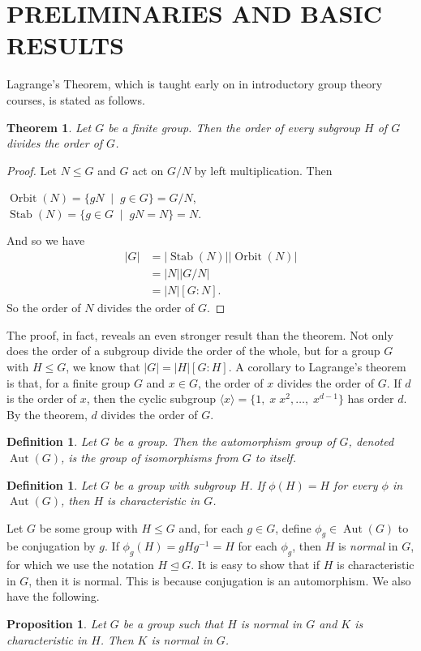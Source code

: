 \documentclass[12pt]{report}
\theoremstyle{newthm}
\newtheorem{Proposition}[lem]{Proposition}
\newtheorem{Theorem}[lem]{Theorem}
\newtheorem{Definition}[lem]{Definition}
\DeclareMathOperator{\Aut}{Aut}
\DeclareMathOperator{\Orbit}{Orbit}
\DeclareMathOperator{\Stab}{Stab}
\begin{document}
\section{PRELIMINARIES AND BASIC RESULTS}



Lagrange's Theorem, which is taught early on in introductory group theory courses, is stated as follows.

\begin{Theorem} Let $G$ be a finite group. Then the order of every subgroup $H$ of $G$ divides the order of $G$.
\end{Theorem}
\begin{proof}
Let $N\leq G$ and $G$ act on $G/N$ by left multiplication. Then \begin{center}$\Orbit(N)=\{gN\;\mid\;g\in G\} = G/N$, \\ $\Stab(N)=\{g\in G\;\mid\; gN=N\}=N$.\end{center} And so we have \begin{align*}
    |G| &= |\Stab(N)||\Orbit(N)|\\
    &= |N||G/N| \\
    &= |N|[G:N].
\end{align*}
So the order of $N$ divides the order of $G$.
\end{proof}


The proof, in fact, reveals an even stronger result than the theorem. Not only does the order of a subgroup divide the order of the whole, but for a group $G$ with $H\leq G$, we know that $|G|=|H|[G:H]$. 
A corollary to  Lagrange's theorem is that, for a finite group $G$ and $x\in G$, the order of $x$ divides the order of $G$. If $d$ is the order of $x$, then the cyclic subgroup $\langle x \rangle = \{1,\;x\;x^2,\dotsc ,\; x^{d-1}\}$ has order $d$. By the theorem, $d$ divides the order of $G$.

\begin{Definition} 
Let $G$ be a group. Then the \textit{automorphism group of $G$}, denoted $\Aut(G)$, is the group of isomorphisms from $G$ to itself.
\end{Definition}

\begin{Definition}
Let $G$ be a group with subgroup $H$. If $\phi(H)=H$ for every $\phi$ in $\Aut(G)$, then $H$ is \textit{characteristic} in $G$.
\end{Definition}

\par Let $G$ be some group with $H\leq G$ and, for each $g\in G$, define $\phi_g\in\Aut(G)$ to be conjugation by $g$. If $\phi_g(H)=gHg^{-1}= H$ for each $\phi_g$, then $H$ is \textit{normal} in $G$, for which we use the notation $H\trianglelefteq G$. It is easy to show that if $H$ is characteristic in $G$, then it is normal. This is because conjugation is an automorphism. We also have the following.
\begin{Proposition}\label{norm in char} Let $G$ be a group such that $H$ is normal in $G$ and $K$ is characteristic in $H$. Then $K$ is normal in $G$.
\end{Proposition}
\end{document}
